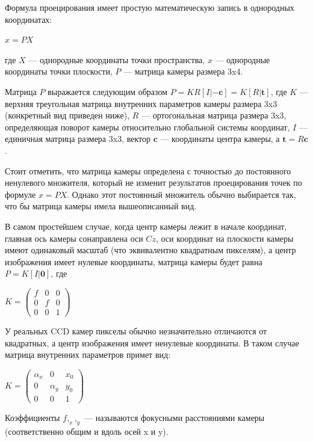 
Формула проецирования имеет простую математическую запись в однородных координатах: 

$x = P X$

где $X$ — однородные координаты точки пространства, $x$ — однородные координаты точки плоскости, $P$ — матрица камеры размера 3x4.

Матрица $P$ выражается следующим образом $P = KR[ I | -\textbf{c}] = K[R|\textbf{t}]$, где $K$ — верхняя треугольная матрица внутренних параметров камеры размера 3x3 (конкретный вид приведен ниже), $R$ — ортогональная матрица размера 3x3, определяющая поворот камеры относительно глобальной системы координат, $I$ — единичная матрица размера 3x3, вектор $\textbf{c}$ — координаты центра камеры, а $\textbf{t} = R\textbf{c}$.

Стоит отметить, что матрица камеры определена с точностью до постоянного ненулевого множителя, который не изменит результатов проецирования точек по формуле $x = P X$. Однако этот постоянный множитель обычно выбирается так, что бы матрица камеры имела вышеописанный вид.

В самом простейшем случае, когда центр камеры лежит в начале координат, главная ось камеры сонаправлена оси $Cz$, оси координат на плоскости камеры имеют одинаковый масштаб (что эквивалентно квадратным пикселям), а центр изображения имеет нулевые координаты, матрица камеры будет равна $P = K[I|\textbf{0}]$, где

$K = \begin{pmatrix}
	f & 0 & 0\\
	0 & f & 0\\
	0 & 0 & 1
\end{pmatrix}$

У реальных CCD камер пикселы обычно незначительно отличаются от квадратных, а центр изображения имеет ненулевые координаты. В таком случае матрица внутренних параметров примет вид: 

$K = \begin{pmatrix}
	\alpha_x & 0 & x_0\\
	0 & \alpha_y & y_0\\
	0 & 0 & 1
\end{pmatrix}$

Коэффициенты $f, _x, _y$ — называются фокусными расстояниями камеры (соответственно общим и вдоль осей x и y).

